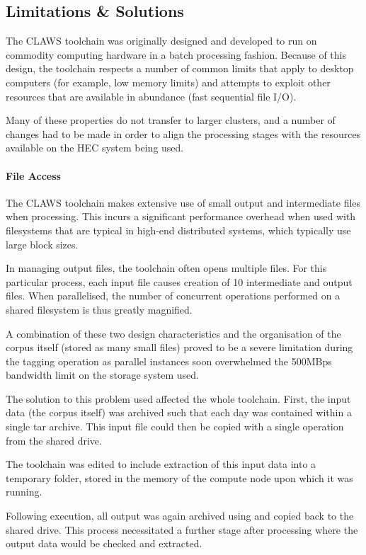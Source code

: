 \subsection{Limitations \& Solutions}
The CLAWS toolchain was originally designed and developed to run on commodity computing hardware in a batch processing fashion.  Because of this design, the toolchain respects a number of common limits that apply to desktop computers (for example, low memory limits) and attempts to exploit other resources that are available in abundance (fast sequential file I/O).

Many of these properties do not transfer to larger clusters, and a number of changes had to be made in order to align the processing stages with the resources available on the HEC system being used.


\paragraph{File Access}
The CLAWS toolchain makes extensive use of small output and intermediate files when processing.  This incurs a significant performance overhead when used with filesystems that are typical in high-end distributed systems, which typically use large block sizes.

In managing output files, the toolchain often opens multiple files.  For this particular process, each input file causes creation of 10 intermediate and output files.  When parallelised, the number of concurrent operations performed on a shared filesystem is thus greatly magnified.

A combination of these two design characteristics and the organisation of the corpus itself (stored as many small files) proved to be a severe limitation during the tagging operation as parallel instances soon overwhelmed the 500MBps bandwidth limit on the storage system used.

The solution to this problem used affected the whole toolchain.  First, the input data (the corpus itself) was archived such that each day was contained within a single tar archive.  This input file could then be copied with a single operation from the shared drive.

The toolchain was edited to include extraction of this input data into a temporary folder, stored in the memory of the compute node upon which it was running.

Following execution, all output was again archived using  and copied back to the shared drive.  This process necessitated a further stage after processing where the output data would be checked and extracted.


